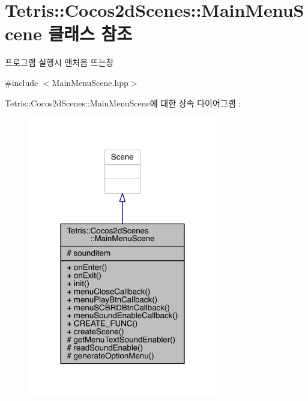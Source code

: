 \hypertarget{class_tetris_1_1_cocos2d_scenes_1_1_main_menu_scene}{}\section{Tetris\+:\+:Cocos2d\+Scenes\+:\+:Main\+Menu\+Scene 클래스 참조}
\label{class_tetris_1_1_cocos2d_scenes_1_1_main_menu_scene}


프로그램 실행시 맨처음 뜨는창  




{\ttfamily \#include $<$Main\+Menu\+Scene.\+hpp$>$}



Tetris\+:\+:Cocos2d\+Scenes\+:\+:Main\+Menu\+Scene에 대한 상속 다이어그램 \+: 
\nopagebreak
\begin{figure}[H]
\begin{center}
\leavevmode
\includegraphics[width=234pt]{d5/dd7/class_tetris_1_1_cocos2d_scenes_1_1_main_menu_scene__inherit__graph}
\end{center}
\end{figure}


